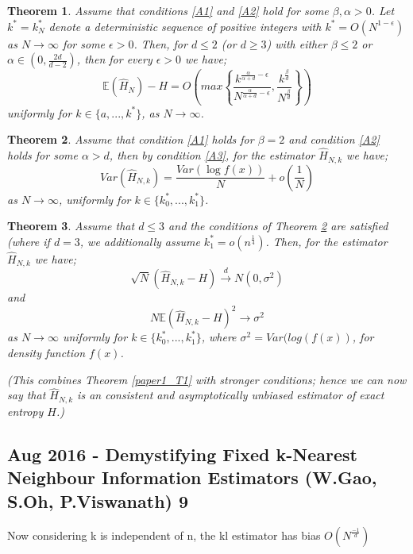 \documentclass{article}
\newtheorem{theorem}{Theorem}
\begin{document}
\begin{theorem} \label{paper4_T1}
Assume that conditions \ref{A1} and \ref{A2} hold for some $\beta, \alpha > 0$. Let  $k^{*} = k_{N}^{*}$ denote a deterministic sequence of positive integers with $k^{*} = O(N^{1-\epsilon})$ as $N \to \infty$  for some $\epsilon > 0$. Then, for $d \leq 2$ (or $d \geq 3$) with either $\beta \leq 2$ or $\alpha \in (0, \frac{2d}{d-2})$, then for every $\epsilon >0$ we have;
\begin{equation}
\mathbb{E} ( \hat{H}_{N} ) - H = O \left( max \left\{ \frac{k^{\frac{\alpha}{\alpha + d} - \epsilon}}{N^{\frac{\alpha}{\alpha + d} - \epsilon}}, \frac{k^{\frac{\beta}{d}}}{N^{\frac{\beta}{d}}} \right\} \right)
\end{equation}
uniformly for $k \in \{ a, ..., k^{*}\}$, as $N \to \infty$.
\end{theorem}


\begin{theorem}\label{paper4_T4}
Assume that condition \ref{A1} holds for $\beta = 2$ and condition \ref{A2} holds for some $\alpha > d$, then by condition \ref{A3}, for the estimator $\hat{H}_{N, k}$ we have;
\begin{equation}
Var(\hat{H}_{N, k}) = \frac{Var(\log f(x))}{N} + o(\frac{1}{N}) \nonumber
\end{equation}
as $N \to \infty$, uniformly for $k \in \{ k_{0}^{*}, ...,  k_{1}^{*} \}$.
\end{theorem}

\begin{theorem} \label{paper4_T5}
Assume that $d \leq 3$ and the conditions of Theorem \ref{paper4_T4} are satisfied (where if $d=3$, we additionally assume $k_{1}^{*} = o(n^{\frac{1}{4}})$. Then, for the estimator $\hat{H}_{N, k}$ we have;
\begin{equation} \label{est_dist}
\sqrt{N}(\hat{H}_{N, k} - H) \xrightarrow{d} N(0, \sigma^2)
\end{equation}
and 
\begin{equation} \label{est_consist}
N \mathbb{E}{(\hat{H}_{N, k} - H)^2} \xrightarrow{} \sigma^2
\end{equation}
as $N \to \infty$ uniformly for $k \in \{ k_{0}^{*}, ...,  k_{1}^{*} \}$, where $\sigma^2 = Var(log(f(x))$, for density function $f(x)$.

(This combines Theorem \ref{paper1_T1} with stronger conditions; hence we can now say that $\hat{H}_{N, k}$ is an consistent and asymptotically unbiased estimator of exact entropy $H$.)
\end{theorem}




\subsection{Aug 2016 - Demystifying Fixed k-Nearest Neighbour Information Estimators (W.Gao, S.Oh, P.Viswanath) 9}

Now considering k is independent of n, the kl estimator has bias  $O(N^{\frac{-1}{d}})$
\end{document}
